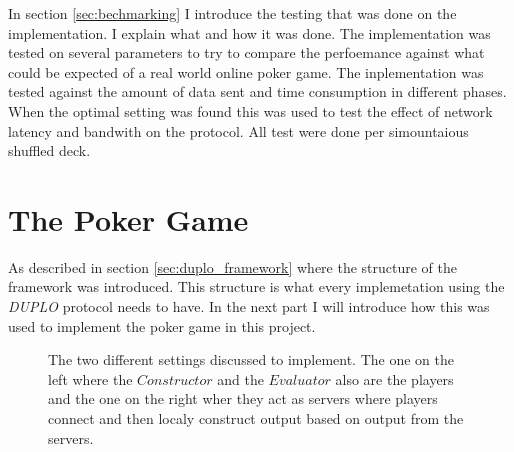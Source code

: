 \documentclass[twoside,11pt,openright]{report}
\newcommand{\DUPLO}{\textit{DUPLO} }
\begin{document}
In section \ref{sec:bechmarking} I introduce the testing that was done on the implementation. I explain what and how it was done. The implementation was tested on several parameters to try to compare the perfoemance against what could be expected of a real world online poker game. The inplementation was tested against the amount of data sent and time consumption in different phases. When the optimal setting was found this was used to test the effect of network latency and bandwith on the protocol. All test were done per simountaious shuffled deck.

\section{The Poker Game}
\label{sec:poker_imp}
As described in section \ref{sec:duplo_framework} where the structure of the framework was introduced. This structure is what every implemetation using the \DUPLO protocol needs to have. In the next part I will introduce how this was used to implement the poker game in this project.

\bigskip

\begin{figure}
\centering

\caption{The two different settings discussed to implement. The one on the left where the $Constructor$ and the $Evaluator$ also are the players and the one on the right wher they act as servers where players connect and then localy construct output based on output from the servers.}
\label{fig:poker_setting}
\end{figure}
\end{document}
